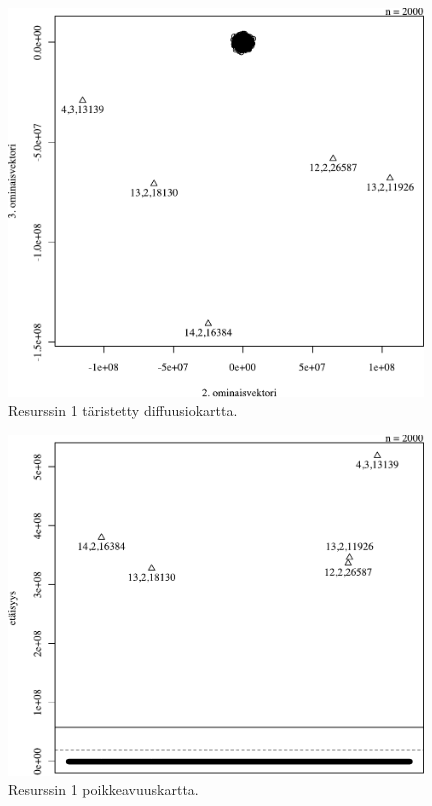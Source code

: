 \begin{figure}[p]
\centering
\includegraphics[width=11cm]{pics/diffuusiokuvat/service_1.pdf}
\caption{Resurssin 1 täristetty diffuusiokartta.}
\label{diffusio_1}
\end{figure}

\begin{figure}[p]
\centering
\includegraphics[width=11cm]{pics/tiheyskuvat/service_1.pdf}
\caption{Resurssin 1 poikkeavuuskartta.}
\label{service_1}
\end{figure}

